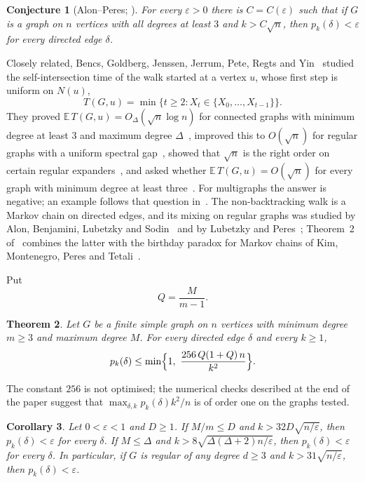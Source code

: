 \documentclass[11pt]{amsart}
\newtheorem{theorem}{Theorem}[section]
\newtheorem{corollary}[theorem]{Corollary}
\newtheorem{conjecture}[theorem]{Conjecture}
\theoremstyle{remark}
\newcommand{\E}{\mathbb{E}}
\begin{document}
\begin{conjecture}[Alon--Peres; {\cite[Conjecture~1.5]{Doz26}}]\label{conj:AP}
For every $\varepsilon>0$ there is $C=C(\varepsilon)$ such that if $G$ is a graph on $n$ vertices with all degrees at
least $3$ and $k>C\sqrt n$, then $p_k(\delta)<\varepsilon$ for every directed edge $\delta$.
\end{conjecture}

Closely related, Bencs, Goldberg, Jenssen, Jerrum, Pete, Regts and Yin~\cite{BGJ26} studied the self-intersection
time of the walk started at a vertex $u$, whose first step is uniform on $N(u)$,
\[
T(G,u)=\min\{t\ge2: X_t\in\{X_0,\dots,X_{t-1}\}\}.
\]
They proved $\E\,T(G,u)=O_\Delta(\sqrt n\log n)$ for connected graphs with minimum degree at least $3$ and maximum
degree $\Delta$~\cite[Theorem~1]{BGJ26}, improved this to $O(\sqrt n)$ for regular graphs with a uniform spectral
gap~\cite[Theorem~2]{BGJ26}, showed that $\sqrt n$ is the right order on certain regular expanders~\cite[Theorem~3]{BGJ26},
and asked whether $\E\,T(G,u)=O(\sqrt n)$ for every graph with minimum degree at least three~\cite[Question~4]{BGJ26}.
For multigraphs the answer is negative; an example follows that question in~\cite{BGJ26}. The non-backtracking walk
is a Markov chain on directed edges, and its mixing on regular graphs was studied by Alon, Benjamini, Lubetzky and
Sodin~\cite{ABLS07} and by Lubetzky and Peres~\cite{LP16}; Theorem~2 of~\cite{BGJ26} combines the latter with the
birthday paradox for Markov chains of Kim, Montenegro, Peres and Tetali~\cite[Theorem~3.6]{KMPT10}.

Put
\[
Q=\frac{M}{m-1}.
\]

\begin{theorem}\label{thm:main}
Let $G$ be a finite simple graph on $n$ vertices with minimum degree $m\ge3$ and maximum degree $M$. For every
directed edge $\delta$ and every $k\ge1$,
\[
p_k(\delta)\le\min\Bigl\{1,\ \frac{256\,Q(1+Q)\,n}{k^2}\Bigr\}.
\]
\end{theorem}

The constant $256$ is not optimised; the numerical checks described at the end of the paper suggest that
$\max_{\delta,k}p_k(\delta)k^2/n$ is of order one on the graphs tested.

\begin{corollary}\label{cor:constants}
Let $0<\varepsilon<1$ and $D\ge1$. If $M/m\le D$ and $k>32D\sqrt{n/\varepsilon}$, then $p_k(\delta)<\varepsilon$ for
every $\delta$. If $M\le\Delta$ and $k>8\sqrt{\Delta(\Delta+2)n/\varepsilon}$, then $p_k(\delta)<\varepsilon$ for every
$\delta$. In particular, if $G$ is regular of any degree $d\ge3$ and $k>31\sqrt{n/\varepsilon}$, then
$p_k(\delta)<\varepsilon$.
\end{corollary}
\end{document}
